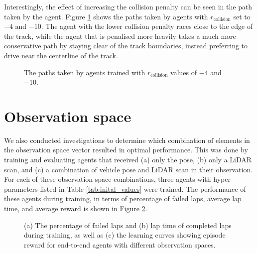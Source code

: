 

Interestingly, the effect of increasing the collision penalty can be seen in the path taken by the agent.
Figure \ref{fig:path_reward_collision} shows the paths taken by agents with $r_{\text{collision}}$ set to $-4$ and $-10$.
The agent with the lower collision penalty races close to the edge of the track, while the agent that is penalised more heavily takes a much more conservative path by staying clear of the track boundaries, instead preferring to drive near the centerline of the track.

\begin{figure}[htb!]
    \centering
    
    \caption[Paths taken by agents trained with different collision penalties]{The paths taken by agents trained with $r_{\text{collision}}$ values of $-4$ and $-10$.}
    \label{fig:path_reward_collision}
\end{figure}











\section{Observation space}\label{sec:obs_space}

We also conducted investigations to determine which combination of elements in the observation space vector resulted in optimal performance.
This was done by training and evaluating agents that received (a) only the pose, (b) only a LiDAR scan, and (c) a combination of vehicle pose and LiDAR scan in their observation.
For each of these observation space combinations, three agents with hyper-parameters listed in Table \ref{tab:inital_values} were trained.
The performance of these agents during training, in terms of percentage of failed laps, average lap time, and average reward is shown in Figure \ref{fig:obs_space}.

\begin{figure}[htb!]
    \centering
    
    \caption[Learning curves of agents with different observation spaces]{(a) The percentage of failed laps and (b) lap time of completed laps during training, as well as (c) the learning curves showing episode reward for end-to-end agents with different observation spaces.}
    \label{fig:obs_space}
\end{figure}

